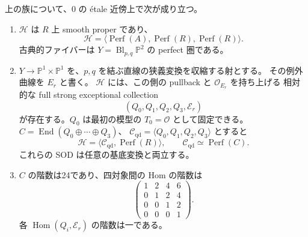 \begin{theorem}\label{thm:relative-two-contractions}
上の族について、$0$ の \'etale 近傍上で次が成り立つ。
\begin{enumerate}
\item
$\mathcal H$ は $R$ 上 smooth proper であり、
\[
 \mathcal H=
 \langle\operatorname{Perf}(A),\operatorname{Perf}(R),\operatorname{Perf}(R)\rangle.
 \label{eq:relative-plane-sod}\tag{RB1}
\]
古典的ファイバーは
$Y=\operatorname{Bl}_{p,q}\mathbb P^2$ の perfect 圏である。
\item
$Y\to\mathbb P^1\times\mathbb P^1$ を、$p,q$ を結ぶ直線の狭義変換を収縮する射とする。
その例外曲線を $E_r$ と書く。
$\mathcal H$ には、この側の pullback と $\mathcal O_{E_r}$ を持ち上げる
相対的な full strong exceptional collection
\[
                 (Q_0,Q_1,Q_2,Q_3,\mathcal E_r)
\]
が存在する。$Q_0$ は最初の模型の $T_0=\mathcal O$ として固定できる。
$C=\operatorname{End}(Q_0\oplus\cdots\oplus Q_3)$、
$\mathcal C_{\mathrm{qd}}=\langle Q_0,Q_1,Q_2,Q_3\rangle$ とすると
\[
 \mathcal H=
 \langle\mathcal C_{\mathrm{qd}},\operatorname{Perf}(R)\rangle,
 \qquad \mathcal C_{\mathrm{qd}}\simeq\operatorname{Perf}(C).
 \label{eq:relative-quadric-sod}\tag{RB2}
\]
これらの SOD は任意の基底変換と両立する。
\item
$C$ の階数は24であり、四対象間の Hom の階数は
\[
 \begin{pmatrix}
 1&2&4&6\\
 0&1&2&4\\
 0&0&1&2\\
 0&0&0&1
 \end{pmatrix}.
 \label{eq:relative-quadric-ranks}\tag{RB3}
\]
各 $\operatorname{Hom}(Q_i,\mathcal E_r)$ の階数は一である。
\end{enumerate}
\end{theorem}


